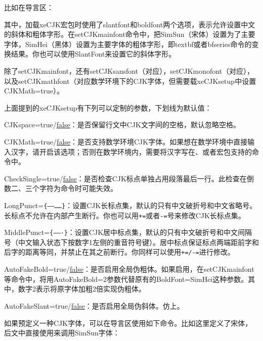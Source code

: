 比如在导言区：
\begin{latex}
\usepackage[slantfont,boldfont]{xeCJK}
\end{latex}

其中，加载xeCJK宏包时使用了slantfont和boldfont两个选项，表示允许设置中文的斜体和粗体字形。在setCJKmainfont命令中，把SimSun（宋体）设置为了主要字体，SimHei（黑体）设置为主要字体的粗体字形，即textbf或者bfseries命令的变换结果。你也可以使用SlantFont来设置它的斜体字形。

除了setCJKmainfont，还有setCJKsansfont（对应），setCJKmonofont（对应），以及setCJKmathfont（对应数学环境下的CJK字体，但需要载xeCJKsetup中设置CJKMath=true）。

上面提到的xeCJKsetup有下列可以定制的参数，下划线为默认值：
\begin{feai}
\item CJKspace=true/\uline{false}：是否保留行文中CJK文字间的空格，默认忽略空格。
\item CJKMath=true/\uline{false}：是否支持数学环境CJK字体。如果想在数学环境中直接输入汉字，请开启该选项；否则在数学环境内，需要将汉字写在、或者宏包支持的命令中。
\item CheckSingle=true/\uline{false}：是否检查CJK标点单独占用段落最后一行。此检查在倒数二、三个字符为命令时可能失效。
\item LongPunct=\verb|{——……}|：设置CJK长标点集，默认的只有中文破折号和中文省略号。长标点不允许在内部产生断行。你也可以用\texttt{+=}或者\texttt{-=}号来修改CJK长标点集。
\item MiddlePunct=\verb|{——·}|：设置CJK居中标点集，默认的只有中文破折号和中文间隔号（中文输入状态下按数字1左侧的重音符号键）。居中标点保证标点两端距前字和后字的距离等同，并禁止在其之前断行。你同样可以使用\texttt{+=/-=}进行修改。
\item AutoFakeBold=true/\uline{false}：是否启用全局伪粗体。如果启用，在setCJKmainfont等命令中，将用AutoFakeBold=2参数代替原有的BoldFont=SimHei这种参数。其中，数字2表示将原字体加粗2倍实现伪粗体。
\item AutoFakeSlant=true/\uline{false}：是否启用全局伪斜体。仿上。
\end{feai}

如果预定义一种CJK字体，可以在导言区使用如下命令。比如这里定义了宋体，后文中直接使用来调用SimSun字体：
\begin{latex}
\newCJKfontfamily[song]
\end{latex}

